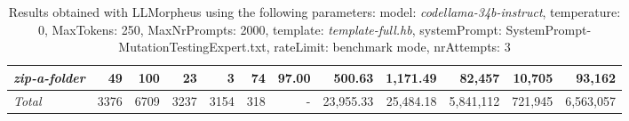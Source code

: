 \begin{table*}
{\begin{tabular}{l||r|r|r|r|r|r||r|r||r|r|r}
   \hline
   \textit{zip-a-folder} & 49 & 100 & 23 & 3 & 74 & 97.00 & 500.63 & 1,171.49 & 82,457 & 10,705 & 93,162 \\ 
   \hline
   \textit{Total} & 3376 & 6709 & 3237 & 3154 & 318 & - & 23,955.33  & 25,484.18 & 5,841,112 & 721,945 & 6,563,057 \\ 
 \end{tabular}
 }
 \caption{Results obtained with LLMorpheus using the following parameters: 
   model: \textit{codellama-34b-instruct}, 
   temperature: 0, 
   MaxTokens: 250, 
   MaxNrPrompts: 2000, 
   template: \textit{template-full.hb}, 
   systemPrompt: SystemPrompt-MutationTestingExpert.txt, 
   rateLimit: benchmark mode, 
   nrAttempts: 3  
 }
\end{table*}

